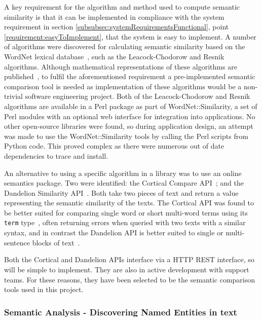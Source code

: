 \documentclass[authoryearcitations]{UoYCSproject}
\begin{document}
A key requirement for the algorithm and method used to compute semantic similarity is that it can be implemented in compliance with the system requirement in section \ref{subsubsec:systemRequirementsFunctional}, point \ref{requirement:easyToImplement}, that the system is easy to implement. A number of algorithms were discovered for calculating semantic similarity based on the WordNet lexical database~\cite{wordNet}, such as the Leacock-Chodorow and Resnik algorithms. Although mathematical representations of these algorithms are published~\cite{leacock1998combining,resnik1995using}, to fulfil the aforementioned requirement a pre-implemented semantic comparison tool is needed as implementation of these algorithms would be a non-trivial software engineering project. Both of the Leacock-Chodorow and Resnik algorithms are available in a Perl package as part of WordNet::Similarity, a set of Perl modules with an optional web interface for integration into applications. No other open-source libraries were found, so during application design, an attempt was made to use the WordNet::Similarity tools by calling the Perl scripts from Python code. This proved complex as there were numerous out of date dependencies to trace and install.

An alternative to using a specific algorithm in a library was to use an online semantics package. Two were identified: the Cortical Compare API~\cite{serviceCorticalSim}; and the Dandelion Similarity API~\cite{serviceDandelionSim}. Both take two pieces of text and return a value representing the semantic similarity of the texts. The Cortical API was found to be better suited for comparing single word or short multi-word terms using its \texttt{term} type~\cite{serviceCorticalSim}, often returning errors when queried with two texts with a similar syntax, and in contrast the Dandelion API is better suited to single or multi-sentence blocks of text~\cite{dandelionSim}.

Both the Cortical and Dandelion APIs interface via a HTTP REST interface, so will be simple to implement. They are also in active development with support teams. For these reasons, they have been selected to be the semantic comparison tools used in this project.

\subsubsection{Semantic Analysis - Discovering Named Entities in text}
\label{sec:choosingNamedEntityExtractionApi}
\end{document}
